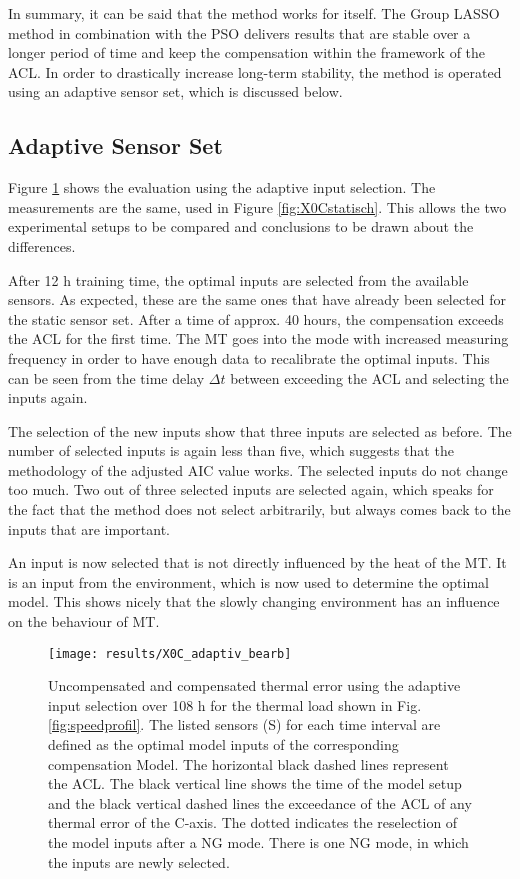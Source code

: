 In summary, it can be said that the method works for itself. The Group LASSO method in combination with the PSO delivers results that are stable over a longer period of time and keep the compensation within the framework of the ACL. In order to drastically increase long-term stability, the method is operated using an adaptive sensor set, which is discussed below.\\

\subsection{Adaptive Sensor Set}
\label{sec:adaptive_sensor_set}

Figure \ref{fig:X0Cadaptiv} shows the evaluation using the adaptive input selection. The measurements are the same, used in Figure \ref{fig:X0Cstatisch}. This allows the two experimental setups to be compared and conclusions to be drawn about the differences.

After 12 h training time, the optimal inputs are selected from the available sensors. As expected, these are the same ones that have already been selected for the static sensor set. After a time of approx. 40 hours, the compensation exceeds the ACL for the first time. The MT goes into the mode with increased measuring frequency in order to have enough data to recalibrate the optimal inputs. This can be seen from the time delay $\Delta t$ between exceeding the ACL and selecting the inputs again.

The selection of the new inputs show that three inputs are selected as before. The number of selected inputs is again less than five, which suggests that the methodology of the adjusted AIC value works. The selected inputs do not change too much. Two out of three selected inputs are selected again, which speaks for the fact that the method does not select arbitrarily, but always comes back to the inputs that are important.

An input is now selected that is not directly influenced by the heat of the MT. It is an input from the environment, which is now used to determine the optimal model. This shows nicely that the slowly changing environment has an influence on the behaviour of MT.



\begin{figure}[!htb]
    \centering
    \texttt{[image: results/X0C\_adaptiv\_bearb]} %
    \caption[Detail deviation $E_{X0C}$ - adaptive]{Uncompensated and compensated thermal
    error using the adaptive input selection over 108 h for the thermal load shown in Fig. \ref{fig:speedprofil}. The listed sensors (S) for each time interval are defined as the optimal model inputs of the corresponding compensation Model. The horizontal black dashed lines represent the ACL. The black vertical line shows the time of the model setup and the black vertical dashed lines the exceedance of the ACL of any thermal error of the C-axis. The dotted indicates the reselection of the model inputs after a NG mode. There is one NG mode, in which the inputs are newly selected.}
    \label{fig:X0Cadaptiv}
\end{figure}

